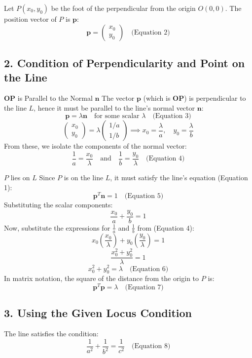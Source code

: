 \documentclass[journal]{IEEEtran}
\begin{document}
Let $P(x_0, y_0)$ be the foot of the perpendicular from the origin $O(0, 0)$. The position vector of $P$ is $\mathbf{p}$:
$$\mathbf{p} = \begin{pmatrix} x_0 \\ y_0 \end{pmatrix} \quad \text{(Equation 2)}$$



\subsection*{2. Condition of Perpendicularity and Point on the Line}

$\mathbf{OP}$ is Parallel to the Normal $\mathbf{n}$
The vector $\mathbf{p}$ (which is $\mathbf{OP}$) is perpendicular to the line $L$, hence it must be parallel to the line's normal vector $\mathbf{n}$:
$$\mathbf{p} = \lambda \mathbf{n} \quad \text{for some scalar } \lambda \quad \text{(Equation 3)}$$
$$\begin{pmatrix} x_0 \\ y_0 \end{pmatrix} = \lambda \begin{pmatrix} 1/a \\ 1/b \end{pmatrix} \implies x_0 = \frac{\lambda}{a}, \quad y_0 = \frac{\lambda}{b}$$
From these, we isolate the components of the normal vector:
$$\frac{1}{a} = \frac{x_0}{\lambda} \quad \text{and} \quad \frac{1}{b} = \frac{y_0}{\lambda} \quad \text{(Equation 4)}$$

$P$ lies on $L$
Since $P$ is on the line $L$, it must satisfy the line's equation (Equation 1):
$$\mathbf{p}^T \mathbf{n} = 1 \quad \text{(Equation 5)}$$
Substituting the scalar components:
$$\frac{x_0}{a} + \frac{y_0}{b} = 1$$
Now, substitute the expressions for $\frac{1}{a}$ and $\frac{1}{b}$ from (Equation 4):
$$x_0 \left(\frac{x_0}{\lambda}\right) + y_0 \left(\frac{y_0}{\lambda}\right) = 1$$
$$\frac{x_0^2 + y_0^2}{\lambda} = 1$$
$$x_0^2 + y_0^2 = \lambda \quad \text{(Equation 6)}$$
In matrix notation, the square of the distance from the origin to $P$ is:
$$\mathbf{p}^T \mathbf{p} = \lambda \quad \text{(Equation 7)}$$



\subsection*{3. Using the Given Locus Condition}

The line satisfies the condition:
$$\frac{1}{a^2} + \frac{1}{b^2} = \frac{1}{c^2} \quad \text{(Equation 8)}$$
\end{document}
